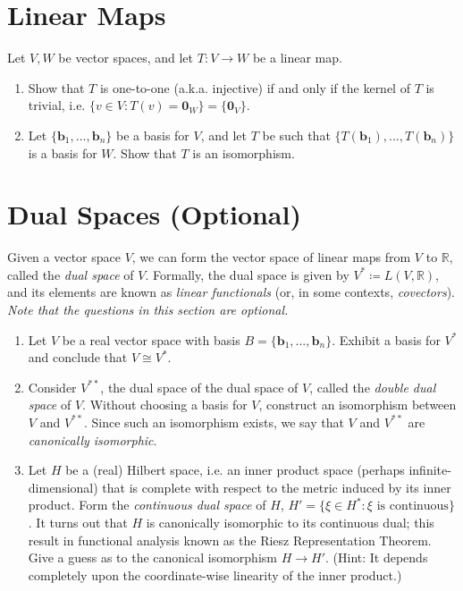 \documentclass{article}
\begin{document}
\section{Linear Maps} 
Let $V,W$ be vector spaces, and let $T: V \to W$ be a linear map. 
\begin{enumerate}[label=\arabic*.]
	\item Show that $T$ is one-to-one (a.k.a. injective) if and only if the kernel of $T$ is trivial, i.e. $\{v \in V: T(v) = \textbf{0}_W\} = \{\textbf{0}_V\}$. 
	\item Let $\{\textbf{b}_1, ... , \textbf{b}_n\}$ be a basis for $V$, and let $T$ be such that $\{T(\textbf{b}_1), ... , T(\textbf{b}_n)\}$ is a basis for $W$. Show that $T$ is an isomorphism. 
\end{enumerate}

\section{Dual Spaces (Optional)}
Given a vector space $V$, we can form the vector space of linear maps from $V$ to $\mathbb{R}$, called the \textit{dual space} of $V$. Formally, the dual space is given by $V^* \coloneqq L(V, \mathbb{R})$, and its elements are known as \textit{linear functionals} (or, in some contexts, \textit{covectors}). \textit{Note that the questions in this section are optional.}
\begin{enumerate}[label=\arabic*.]
	\item Let $V$ be a real vector space with basis $B = \{\textbf{b}_1, ... , \textbf{b}_n\}$. Exhibit a basis for $V^*$ and conclude that $V \cong V^*$. 
	\item Consider $V^{**}$, the dual space of the dual space of $V$, called the \textit{double dual space} of $V$. Without choosing a basis for $V$, construct an isomorphism between $V$ and $V^{**}$. Since such an isomorphism exists, we say that $V$ and $V^{**}$ are \textit{canonically isomorphic}.
	\item Let $H$ be a (real) Hilbert space, i.e. an inner product space (perhaps infinite-dimensional) that is complete with respect to the metric induced by its inner product. Form the \textit{continuous dual space} of $H$, $H' = \{\xi \in H^*: \xi \text{ is continuous} \}$. It turns out that $H$ is canonically isomorphic to its continuous dual; this result in functional analysis known as the Riesz Representation Theorem. Give a guess as to the canonical isomorphism $H \to H'$. (Hint: It depends completely upon the coordinate-wise linearity of the inner product.)
\end{enumerate}
\end{document}
